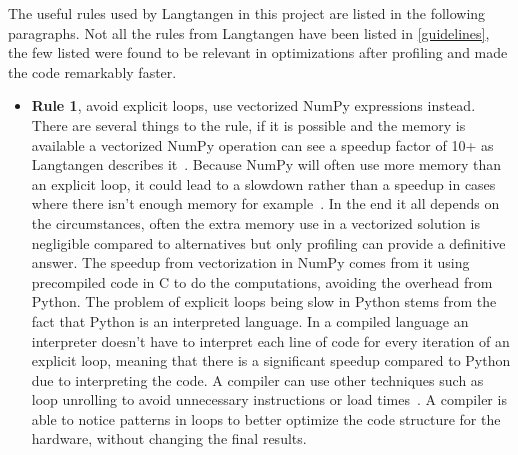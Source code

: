 \documentclass[12pt, a4paper]{article}
\begin{document}
The useful rules used by Langtangen in this project are listed in the following paragraphs.
Not all the rules from Langtangen have been listed in \cref{guidelines}, the few listed were found to be relevant in optimizations after profiling and made the code remarkably faster.
\begin{itemize}\label{guidelines}
    \item \textbf{Rule 1}, avoid explicit loops, use vectorized NumPy expressions instead.
    There are several things to the rule, if it is possible and the memory is available a vectorized NumPy operation can see a speedup factor of 10+ as Langtangen describes it~\cite{NumpyArray}.
    Because NumPy will often use more memory than an explicit loop, it could lead to a slowdown rather than a speedup in cases where there isn't enough memory for example~\cite{Numpy:Vectorization}.
    In the end it all depends on the circumstances, often the extra memory use in a vectorized solution is negligible compared to alternatives but only profiling can provide a definitive answer.
    The speedup from vectorization in NumPy comes from it using precompiled code in C to do the computations, avoiding the overhead from Python.
    The problem of explicit loops being slow in Python stems from the fact that Python is an interpreted language.
    In a compiled language an interpreter doesn't have to interpret each line of code for every iteration of an explicit loop, meaning that there is a significant speedup compared to Python due to interpreting the code.
    A compiler can use other techniques such as loop unrolling to avoid unnecessary instructions or load times~\cite{wiki:LoopUnroll}.
    A compiler is able to notice patterns in loops to better optimize the code structure for the hardware, without changing the final results.


\end{itemize}
\end{document}
